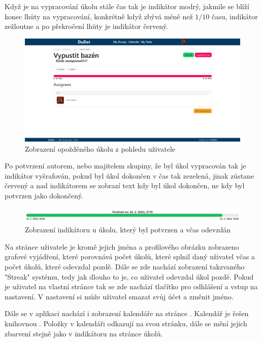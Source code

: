 Když je na vypracování úkolu stále čas tak je indikátor modrý, jakmile se blíží konec lhůty na vypracování, konkrétně když zbývá méně než \(1/10\) času, indikátor zežloutne a po překročení lhůty je indikátor červený.

\begin{figure}[hbt!]
	\centering
	\includegraphics[width=1\linewidth]{img/opozdenyUkol.png}
	\caption{Zobrazení opožděného úkolu z pohledu uživatele}
\end{figure}

Po potvrzení autorem, nebo majitelem skupiny, že byl úkol vypracován tak je indikátor vyšrafován, pokud byl úkol dokončen v čas tak zezelená, jinak zůstane červený a nad indikátorem se zobrazí text kdy byl úkol dokončen, ne kdy byl potvrzen jako dokončený.

\begin{figure}[hbt!]
	\centering
	\includegraphics[width=1\linewidth]{img/progressOnTime.png}
	\caption{Zobrazení indikátoru u úkolu, který byl potvrzen a včas odevzdán}
\end{figure}


Na stránce uživatele je kromě jejich jména a profilového obrázku zobrazeno grafové vyjádření, které porovnává počet úkolů, které splnil daný uživatel včas a počet úkolů, které odevzdal pozdě. Dále se zde nachází zobrazení takzvaného "Streak" systému, tedy jak dlouho to je, co uživatel odevzdal úkol pozdě. Pokud je uživatel na vlastní stránce tak se zde nachází tlačítko pro odhlášení a vstup na nastavení. V nastavení si může uživatel smazat svůj účet a změnit jméno.

Dále se v aplikaci nachází i zobrazení kalendáře na stránce . Kalendář je řešen knihovnou . Položky v kalendáři odkazují na svou stránku, dále se mění jejich zbarvení stejně jako v indikátoru na stránce úkolů.